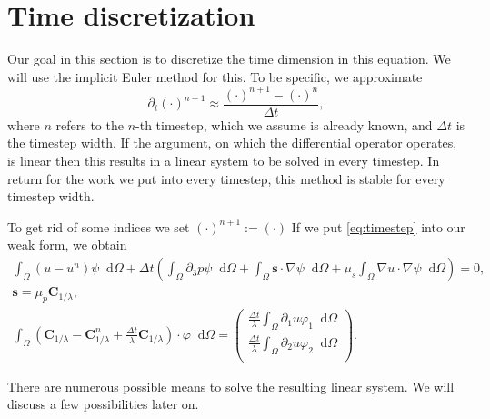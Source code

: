 \documentclass[12pt,a4paper,twoside, open=right]{scrreprt}
\theoremstyle{definition}
\theoremstyle{plain}
\newcommand{\bfs}{\bm{s}}
\newcommand{\bfC}{\bm{C}}
\newcommand{\D}{\mathop{}\!\mathrm{d}}
\begin{document}
\section{Time discretization}
Our goal in this section is to discretize the time dimension in this equation. We will use the implicit Euler method for this. To be specific, we approximate 
\begin{equation}
    \partial_t(\cdot)^{n+1}\approx\frac{(\cdot)^{n+1}-(\cdot)^n}{\Delta t},\label{eq:timestep}
\end{equation}
where $n$ refers to the $n$-th timestep, which we assume is already known, and $\Delta t$ is the timestep width. If the argument, on which the differential operator operates, is linear then this results in a linear system to be solved in every timestep. In return for the work we put into every timestep, this method is stable for every timestep width.
\par 
To get rid of some indices we set $(\cdot)^{n+1}:=(\cdot)$ If we put \eqref{eq:timestep} into our weak form, we obtain 
\begin{align}
  \int_\Omega(u-u^n)\psi\D\Omega +\Delta t\left(\int_\Omega\partial_3 p\psi\D\Omega + \int_\Omega\bfs\cdot\nabla\psi\D\Omega+\mu_s\int_\Omega\nabla u\cdot\nabla\psi\D\Omega\right) = 0,\\
  \bfs =\mu_p\bfC_{1/\lambda},\\
  \int_\Omega(\bfC_{1/\lambda} - \bfC_{1/\lambda}^n +\frac{\Delta t}{\lambda}\bfC_{1/\lambda})\cdot\varphi\D\Omega = 
  \begin{pmatrix}
  \frac{\Delta t}{\lambda}\int_\Omega\partial_1 u\varphi_1\D\Omega\\\frac{\Delta t}{\lambda}\int_\Omega\partial_2 u\varphi_2\D\Omega\\
  \end{pmatrix}.
\end{align}
\par 
There are numerous possible means to solve the resulting linear system. We will discuss a few possibilities later on.
\end{document}
